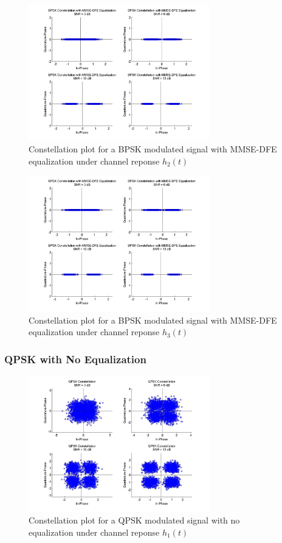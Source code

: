 \documentclass[]{article}
\begin{document}
\begin{figure}[H]
\centering
\includegraphics[width=0.7\textwidth]{bpConstMMSEDFE2.jpg}
\caption{Constellation plot for a BPSK modulated signal with MMSE-DFE equalization under channel reponse $h_2(t)$}
\end{figure}

\begin{figure}[H]
\centering
\includegraphics[width=0.7\textwidth]{bpConstMMSEDFE3.jpg}
\caption{Constellation plot for a BPSK modulated signal with MMSE-DFE equalization under channel reponse $h_3(t)$}
\end{figure}


\subsubsection{QPSK with No Equalization}

\begin{figure}[H]
\centering
\includegraphics[width=0.7\textwidth]{qpConst1.jpg}
\caption{Constellation plot for a QPSK modulated signal with no equalization under channel reponse $h_1(t)$}
\end{figure}
\end{document}
